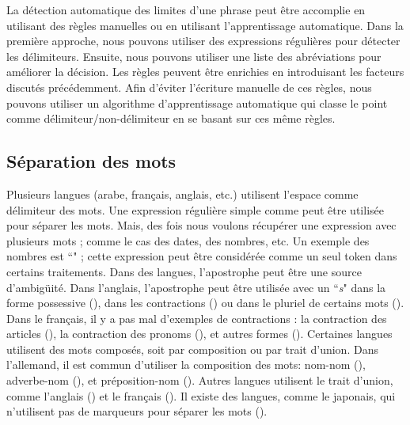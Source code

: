 \documentclass{KodeBook}
\begin{document}
La détection automatique des limites d'une phrase peut être accomplie en utilisant des règles manuelles ou en utilisant l'apprentissage automatique. 
Dans la première approche, nous pouvons utiliser des expressions régulières pour détecter les délimiteurs. 
Ensuite, nous pouvons utiliser une liste des abréviations pour améliorer la décision. 
Les règles peuvent être enrichies en introduisant les facteurs discutés précédemment. 
Afin d'éviter l'écriture manuelle de ces règles, nous pouvons utiliser un algorithme d'apprentissage automatique qui classe le point comme délimiteur/non-délimiteur en se basant sur ces même règles.


\subsection{Séparation des mots}

Plusieurs langues (arabe, français, anglais, etc.) utilisent l'espace comme délimiteur des mots.
Une expression régulière simple comme \expword{/[ ]+/} peut être utilisée pour séparer les mots. 
Mais, des fois nous voulons récupérer une expression avec plusieurs mots ; comme le cas des dates, des nombres, etc. 
Un exemple des nombres est ``" ; cette expression peut être considérée comme un seul token dans certains traitements.
Dans des langues, l'apostrophe peut être une source d'ambigüité. 
Dans l'anglais, l'apostrophe peut être utilisée avec un ``\textit{s}" dans la forme possessive (), dans les contractions () ou dans le pluriel de certains mots (). 
Dans le français, il y a pas mal d'exemples de contractions : la contraction des articles (), la contraction des pronoms (), et autres formes ().
Certaines langues utilisent des mots composés, soit par composition ou par trait d'union. 
Dans l'allemand, il est commun d'utiliser la composition des mots: nom-nom (), adverbe-nom (), et préposition-nom (). 
Autres langues utilisent le trait d'union, comme l'anglais () et le français (). 
Il existe des langues, comme le japonais, qui n'utilisent pas de marqueurs pour séparer les mots ().
\end{document}
